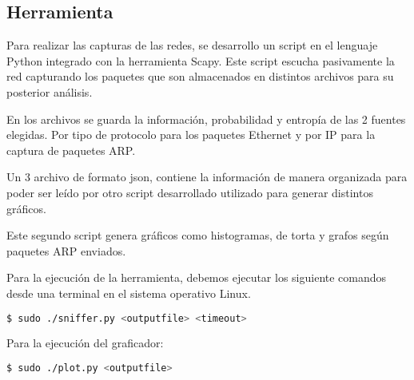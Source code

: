 \subsection{Herramienta}

Para realizar las capturas de las redes, se desarrollo un script en el lenguaje Python integrado con la herramienta Scapy.
Este script escucha pasivamente la red capturando los paquetes que son almacenados en distintos archivos para su posterior análisis.

En los archivos se guarda la información, probabilidad y entropía de las 2 fuentes elegidas. Por tipo de protocolo para los paquetes Ethernet y por IP para la captura de paquetes ARP.

Un 3 archivo de formato json, contiene la información de manera organizada para poder ser leído por otro script desarrollado utilizado para generar distintos gráficos.

Este segundo script genera gráficos como histogramas, de torta y grafos según paquetes ARP enviados.

Para la ejecución de la herramienta, debemos ejecutar los siguiente comandos desde una terminal en el sistema operativo Linux.

\begin{lstlisting}[language=bash]
  $ sudo ./sniffer.py <outputfile> <timeout> 
\end{lstlisting}

Para la ejecución del graficador:

\begin{lstlisting}[language=bash]
  $ sudo ./plot.py <outputfile> 
\end{lstlisting}
